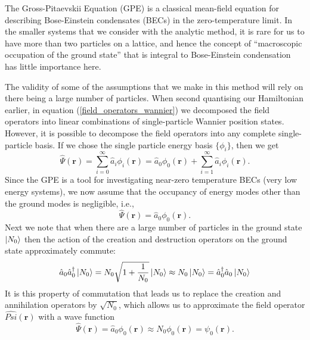 \documentclass[a4paper, 10pt, draft]{article}
\theoremstyle{plain}
\begin{document}
The Gross-Pitaevskii Equation (GPE) is a classical mean-field equation for
describing Bose-Einstein condensates (BECs) in the zero-temperature limit. In
the smaller systems that we consider with the analytic method, it is rare for us
to have more than two particles on a lattice, and hence the concept of
``macroscopic occupation of the ground state'' that is integral to Bose-Einstein
condensation has little importance here.

The validity of some of the assumptions that we make in this
method will rely on there being a large number of particles. When second
quantising our Hamiltonian earlier, in equation (\ref{field_operators_wannier})
we decomposed the field operators into linear combinations of single-particle
Wannier position states. However, it is possible to decompose the field
operators into any complete single-particle basis. If we chose the single
particle energy basis $\{\phi_i\}$, then we get
\begin{equation}
    \hat{\Psi}(\mathbf{r})
    =
    \sum_{i=0}^{\infty}{\hat{a}_i\phi_{i}(\mathbf{r})}
    =
    \hat{a}_{0} \phi_{0}(\mathbf{r}) +
    \sum_{i=1}^{\infty}{\hat{a}_i\phi_{i}(\mathbf{r})}.
\end{equation}
Since the GPE is a tool for investigating near-zero temperature BECs (very low
energy systems), we now assume that the occupancy of energy modes other than
the ground modes is negligible, i.e.,
\begin{equation}
 \hat{\Psi}(\mathbf{r})=\hat{a}_0\phi_{0}(\mathbf{r}).
\end{equation}
Next we note that when there are a large number of particles in the ground
state $\ket{N_0}$ then the action of the creation and destruction operators
on the ground state approximately commute:
\begin{equation}
 \hat{a}_0\hat{a}^\dagger_0\ket{N_0}
 =
 N_0 \sqrt{1+\frac{1}{N_0}}\ket{N_0}
 \approx
 N_0\ket{N_0}
 =
 \hat{a}^\dagger_0\hat{a}_0\ket{N_0}
\end{equation}
It is this property of commutation that leads us to replace the creation and
annihilation operators by $\sqrt{N_0}$, which allows us to approximate the
field operator $\hat{Psi}(\mathbf{r})$ with a wave function
\begin{equation}
    \hat{\Psi}(\mathbf{r})
    =
    \hat{a}_{0} \phi_{0}(\mathbf{r}) \approx N_{0} \phi_{0}(\mathbf{r})
    =
    \psi_{0}(\mathbf{r}).
\end{equation}
\end{document}
